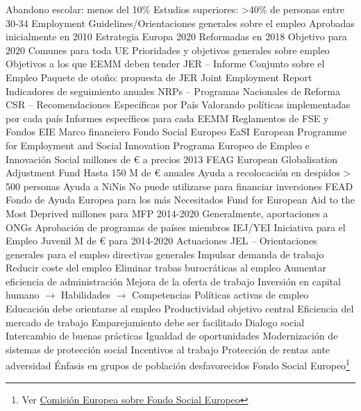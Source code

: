 \documentclass{nuevotema}
\begin{document}
\begin{esquemal}
				\4 Abandono escolar: menos del 10\%
				\4 Estudios superiores: >40\% de personas entre 30-34
			\3 Employment Guidelines/Orientaciones generales sobre el empleo
				\4 Aprobadas inicialmente en 2010
				\4[] Estrategia Europa 2020
				\4 Reformadas en 2018
				\4 Objetivo para 2020
				\4 Comunes para toda UE
				\4 Prioridades y objetivos generales sobre empleo
				\4 Objetivos a los que EEMM deben tender
			\3 JER -- Informe Conjunto sobre el Empleo
				\4 Paquete de otoño: propuesta de JER
				\4 Joint Employment Report
				\4 Indicadores de seguimiento anuales
			\3 NRPs -- Programas Nacionales de Reforma
			\3 CSR -- Recomendaciones Específicas por País
				\4 Valorando políticas implementadas por cada país
				\4 Informes específicos para cada EEMM
			\3 Reglamentos de FSE y Fondos EIE
		\2 Marco financiero
			\3 Fondo Social Europeo
			\3 EaSI
				\4 European Programme for Employment and Social Innovation
				\4 Programa Europeo de Empleo e Innovación Social
				 millones de € a precios 2013
			\3 FEAG
				\4 European Globalisation Adjustment Fund
				\4 Hasta 150 M de € anuales
				\4 Ayuda a recolocación en despidos > 500 personas
				\4 Ayuda a NiNis
				\4 No puede utilizarse para financiar inversiones
			\3 FEAD
				\4 Fondo de Ayuda Europea para los más Necesitados
				\4 Fund for European Aid to the Most Deprived
				 millones para MFP 2014-2020
				\4 Generalmente, aportaciones a ONGs
				\4 Aprobación de programas de países miembros
			\3 IEJ/YEI
				\4 Iniciativa para el Empleo Juvenil
				 M de € para 2014-2020
		\2 Actuaciones
			\3 JEL -- Orientaciones generales para el empleo
				 directivas generales
				\4[v] Impulsar demanda de trabajo
				\4[] Reducir coste del empleo
				\4[] Eliminar trabas burocráticas al empleo
				\4[] Aumentar eficiencia de administración
				\4[vi] Mejora de la oferta de trabajo
				\4[] Inversión en capital humano
				\4[] $\to$ Habilidades
				\4[] $\to$ Competencias
				\4[] Políticas activas de empleo
				\4[] Educación debe orientarse al empleo
				\4[] Productividad objetivo central
				\4[vii] Eficiencia del mercado de trabajo
				\4[] Emparejamiento debe ser facilitado
				\4[] Dialogo social
				\4[] Intercambio de buenas prácticas
				\4[viii] Igualdad de oportunidades
				\4[] Modernización de sistemas de protección social
				\4[] Incentivos al trabajo
				\4[] Protección de rentas ante adversidad
				\4[] Énfasis en grupos de población desfavorecidos
			\3 Fondo Social Europeo\footnote{Ver \href{https://ec.europa.eu/esf/BlobServlet?docId=16259&langId=en}{Comisión Europea sobre Fondo Social Europeo}}

\end{esquemal}
\end{document}
